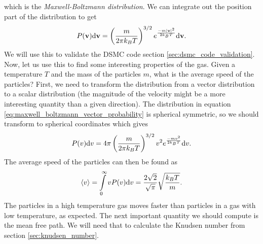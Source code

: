 which is the \textit{Maxwell-Boltzmann distribution}. We can integrate out the position part of the distribution to get
\begin{align}
	\label{eq:maxwell_boltzmann_vector_probability}
	P(\mathbf v)\mathrm{d}\mathbf v = \left(\frac{m}{2\pi k_B T}\right)^{3/2}e^\frac{-m|\mathbf v|^2}{2k_BT} \mathrm{d}\mathbf v.
\end{align}
We will use this to validate the DSMC code section \ref{sec:dsmc_code_validation}. Now, let us use this to find some interesting properties of the gas. Given a temperature $T$ and the mass of the particles $m$, what is the average speed of the particles? First, we need to transform the distribution from a vector distribution to a scalar distribution (the magnitude of the velocity might be a more interesting quantity than a given direction). The distribution in equation \eqref{eq:maxwell_boltzmann_vector_probability} is spherical symmetric, so we should transform to spherical coordinates which gives
\begin{align}
	\label{eq:maxwell_boltzmann_scalar_probability}
	P(v)\mathrm{d}v = 4\pi\left(\frac{m}{2\pi k_B T}\right)^{3/2}v^2e^\frac{-mv^2}{2k_BT} \mathrm{d}v.
\end{align}
The average speed of the particles can then be found as
\begin{align}
	\label{eq:maxwell_boltzmann_average_speed}
	\langle v\rangle = \int\limits_0^\infty vP(v) \mathrm{d}v = \frac{2\sqrt 2}{\sqrt \pi}\sqrt\frac{k_B T}{m}.
\end{align}
The particles in a high temperature gas moves faster than particles in a gas with low temperature, as expected. The next important quantity we should compute is the mean free path. We will need that to calculate the Knudsen number from section \ref{sec:knudsen_number}.